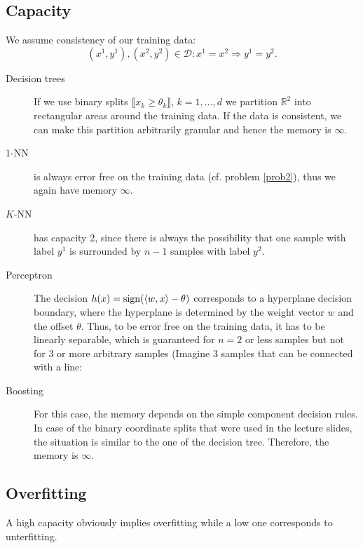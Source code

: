 \documentclass{scrartcl}
\begin{document}
\subsection{Capacity}
We assume consistency of our training data: 
\begin{equation}
	(x^1,y^1),(x^2,y^2)\in \mathcal D: x^1=x^2 \Rightarrow y^1 =y^2.
\end{equation}
\begin{description}
	\item[Decision trees] If we use binary splits $\llbracket x_k \geq \theta_k\rrbracket$, $k=1,\dots,d$ we partition $\mathbb R^2$ into rectangular areas around the training data. If the data is consistent, we can make this partition arbitrarily granular and hence the memory is $\infty$.
	\item[1-NN] is always error free on the training data (cf. problem \ref{prob2}), thus we again have memory $\infty$.
	\item[$K$-NN] has capacity 2, since there is always the possibility that one sample with label $y^1$ is surrounded by $n-1$ samples with label $y^2$.
	\item[Perceptron] The decision $h(x) = \sign(\inprod{w}{x} -\theta)$ corresponds to a hyperplane decision boundary, where the hyperplane is determined by the weight vector $w$ and the offset $\theta$. Thus, to be error free on the training data, it has to be linearly separable, which is guaranteed for $n=2$ or less samples but not for 3 or more arbitrary samples (Imagine 3 samples that can be connected with a line:
	\begin{center}
	\end{center}
	\item[Boosting] For this case, the memory depends on the simple component decision rules. In case of the binary coordinate splits that were used in the lecture slides, the situation is similar to the one of the decision tree. Therefore, the memory is $\infty$.
\end{description}
	
	\subsection{Overfitting}
	A high capacity obviously implies overfitting while a low one corresponds to unterfitting. 
\end{document}
